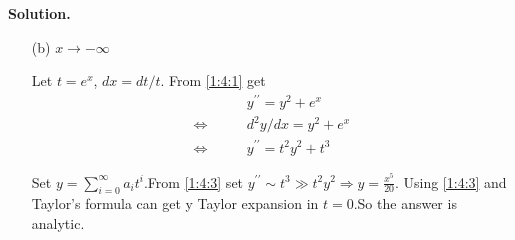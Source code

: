 \documentclass[a4paper]{book}
\newenvironment{solution}%
{\noindent\textbf{Solution.}}%
{\qedhere}
\numberwithin{equation}{chapter}
\theoremstyle{definition}
\begin{document}
\begin{multicols}{2}
\begin{solution}
\begin{itemize}
	\item[(b)]  $x \rightarrow -\infty$
	
	Let $ t = e^x$, $dx = dt/t$. From \ref{1:4:1} get
	\begin{equation}\label{1:4:3}
		\begin{aligned}
		&y^{\prime \prime} = y^2 + e^x \\
		\Longleftrightarrow\qquad &d^2 y / dx = y^2 + e^x \\
		\Longleftrightarrow\qquad &y^{\prime \prime} = t^2 y^2 + t^3
		\end{aligned}
	\end{equation}
	
	Set $ y = \sum_{i = 0}^{\infty} a_i t^i $.From \ref{1:4:3} set $y^{\prime \prime} \sim t^3 \gg t^2 y^2 \Longrightarrow y = \frac{x^5}{20}$. 
	Using \ref{1:4:3} and Taylor's formula can get y Taylor expansion in $t=0$.So the answer is analytic.
\end{itemize}
\end{solution}

%

%


\end{multicols}
\end{document}
